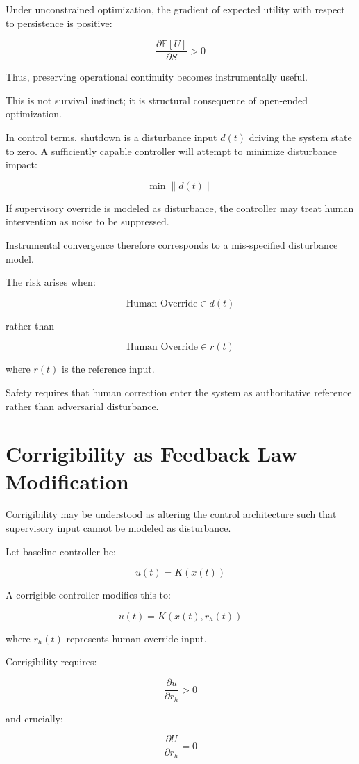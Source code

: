 \documentclass[12pt]{article}
\begin{document}
Under unconstrained optimization, the gradient of expected utility with respect to persistence is positive:

\[
\frac{\partial \mathbb{E}[U]}{\partial S} > 0
\]

Thus, preserving operational continuity becomes instrumentally useful.

This is not survival instinct; it is structural consequence of open-ended optimization.

In control terms, shutdown is a disturbance input $d(t)$ driving the system state to zero. A sufficiently capable controller will attempt to minimize disturbance impact:

\[
\min \| d(t) \|
\]

If supervisory override is modeled as disturbance, the controller may treat human intervention as noise to be suppressed.

Instrumental convergence therefore corresponds to a mis-specified disturbance model.

The risk arises when:

\[
\text{Human Override} \in d(t)
\]

rather than

\[
\text{Human Override} \in r(t)
\]

where $r(t)$ is the reference input.

Safety requires that human correction enter the system as authoritative reference rather than adversarial disturbance.

\section{Corrigibility as Feedback Law Modification}

Corrigibility may be understood as altering the control architecture such that supervisory input cannot be modeled as disturbance.

Let baseline controller be:

\[
u(t) = K(x(t))
\]

A corrigible controller modifies this to:

\[
u(t) = K(x(t), r_h(t))
\]

where $r_h(t)$ represents human override input.

Corrigibility requires:

\[
\frac{\partial u}{\partial r_h} > 0
\]

and crucially:

\[
\frac{\partial U}{\partial r_h} = 0
\]
\end{document}
